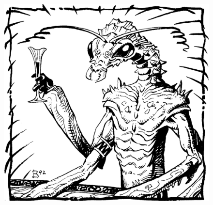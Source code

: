 \begin{figure}[t!]
\centering
\includegraphics[width=\columnwidth]{images/tohrkreen-1.png}
\WOTC
\end{figure}

